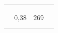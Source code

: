 \begin{table}[H]
\begin{tabular}{lccl}
                                                                                    &                                                                       &                                                               &                                                                                                                                                                                               \\
                                                                                    &                                                                       &                                                               &                                                                                                                                                                                               \\
                                                                                    &                                                                       &                                                               &                                                                                                                                                                                               \\
                                                                                    & 0,38                                                                  & 269                                                           &                                                                                                                                                                                               \\
                                                                                    &                                                                       &                                                               &                                                                                                                                                                                               \\
                                                                                    &                                                                       &                                                               &                                                                                                                                                                                               \\

\end{tabular}
\end{table}
